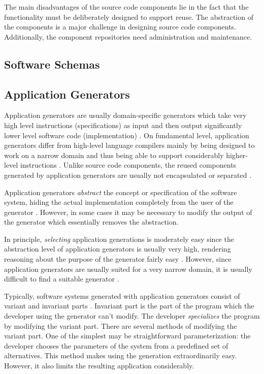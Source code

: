 The main disadvantages of the source code components lie in the fact that the functionality must be deliberately designed to support reuse. The abstraction of the components is a major challenge \citep[chap.~5]{krueger_software_1992} in designing source code components. Additionally, the component repositories need administration and maintenance.

\subsection{Software Schemas}


\subsection{Application Generators}

Application generators are usually domain-specific generators which take very high level instructions (specifications) as input and then output significantly lower level software code (implementation) \citep[chap.~7]{cleaveland_building_1988,krueger_software_1992}. On fundamental level, application generators differ from high-level language compilers mainly by being designed to work on a narrow domain and thus being able to support considerably higher-level instructions \citep[chap.~7]{krueger_software_1992}. Unlike source code components, the reused components generated by application generators are usually not encapsulated or separated \citep[chap.~3]{sametinger_software_1997}.

Application generators \emph{abstract} the concept or specification of the software system, hiding the actual implementation completely from the user of the generator \citep{cleaveland_building_1988}. However, in some cases it may be necessary to modify the output of the generator which essentially removes the abstraction.

In principle, \emph{selecting} application generations is moderately easy since the abstraction level of application generators is usually very high, rendering reasoning about the purpose of the generator fairly easy \citep[chap.~7]{krueger_software_1992}. However, since application generators are usually suited for a very narrow domain, it is usually difficult to find a suitable generator \citep[chap.~7]{krueger_software_1992}.

Typically, software systems generated with application generators consist of variant and invariant parts \citep[chap.~7]{krueger_software_1992}. Invariant part is the part of the program which the developer using the generator can't modify. The developer \emph{specializes} the program by modifying the variant part. There are several methods of modifying the variant part. One of the simplest may be straightforward parameterization: the developer chooses the parameters of the system from a predefined set of alternatives. This method makes using the generation extraordinarily easy. However, it also limits the resulting application considerably.


